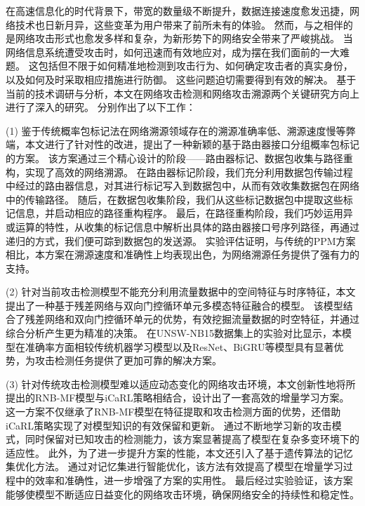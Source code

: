 \begin{cabstract}
在高速信息化的时代背景下，带宽的数量级不断提升，数据连接速度愈发迅捷，网络技术也日新月异，这些变革为用户带来了前所未有的体验。
然而，与之相伴的是网络攻击形式也愈发多样和复杂，为新形势下的网络安全带来了严峻挑战。
当网络信息系统遭受攻击时，如何迅速而有效地应对，成为摆在我们面前的一大难题。
这包括但不限于如何精准地检测到攻击行为、如何确定攻击者的真实身份，以及如何及时采取相应措施进行防御。
这些问题迫切需要得到有效的解决。
基于当前的技术调研与分析，本文在网络攻击检测和网络攻击溯源两个关键研究方向上进行了深入的研究。
分别作出了以下工作：\par
(1) 鉴于传统概率包标记法在网络溯源领域存在的溯源准确率低、溯源速度慢等弊端，本文进行了针对性的改进，提出了一种新颖的基于路由器接口分组概率包标记的方案。
该方案通过三个精心设计的阶段——路由器标记、数据包收集与路径重构，实现了高效的网络溯源。
在路由器标记阶段，我们充分利用数据包传输过程中经过的路由器信息，对其进行标记写入到数据包中，从而有效收集数据包在网络中的传输路径。
随后，在数据包收集阶段，我们从这些标记数据包中提取这些标记信息，并启动相应的路径重构程序。
最后，在路径重构阶段，我们巧妙运用异或运算的特性，从收集的标记信息中解析出具体的路由器接口号序列路径，再通过递归的方式，我们便可踪到数据包的发送源。
实验评估证明，与传统的PPM方案相比，本方案在溯源速度和准确性上均表现出色，为网络溯源任务提供了强有力的支持。\par

(2) 针对当前攻击检测模型不能充分利用流量数据中的空间特征与时序特征，本文提出了一种基于残差网络与双向门控循环单元多模态特征融合的模型。
该模型结合了残差网络和双向门控循环单元的优势，有效挖掘流量数据的时空特征，并通过综合分析产生更为精准的决策。
在UNSW-NB15数据集上的实验对比显示，本模型在准确率方面相较传统机器学习模型以及ResNet、BiGRU等模型具有显著优势，为攻击检测任务提供了更加可靠的解决方案。\par

(3) 针对传统攻击检测模型难以适应动态变化的网络攻击环境，本文创新性地将所提出的RNB-MF模型与iCaRL策略相结合，设计出了一套高效的增量学习方案。
这一方案不仅继承了RNB-MF模型在特征提取和攻击检测方面的优势，还借助iCaRL策略实现了对模型知识的有效保留和更新。
通过不断地学习新的攻击模式，同时保留对已知攻击的检测能力，该方案显著提高了模型在复杂多变环境下的适应性。
此外，为了进一步提升方案的性能，本文还引入了基于遗传算法的记忆集优化方法。
通过对记忆集进行智能优化，该方法有效提高了模型在增量学习过程中的效率和准确性，进一步增强了方案的实用性。
最后经过实验验证，该方案能够使模型不断适应日益变化的网络攻击环境，确保网络安全的持续性和稳定性。\par
\end{cabstract}

